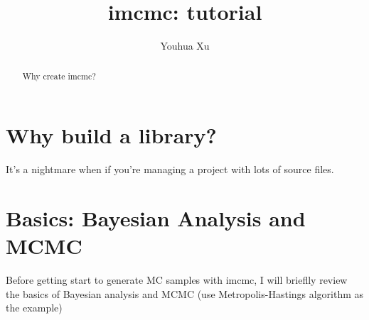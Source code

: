 \documentclass[a4paper,11pt]{article}
\begin{document}
    
\title{imcmc: tutorial}

\author[1,2]{Youhua Xu}

\maketitle

\begin{abstract}
Why create imcmc?
\end{abstract}

\maketitle

\section{Why build a library?}
It's a nightmare when if you're managing a project with lots of source files.

\section{Basics: Bayesian Analysis and MCMC}
Before getting start to generate MC samples with imcmc, I will brieflly
review the basics of Bayesian analysis and MCMC (use Metropolis-Hastings
algorithm as the example)


%
%
%
%
%
%
%
%
\end{document}
